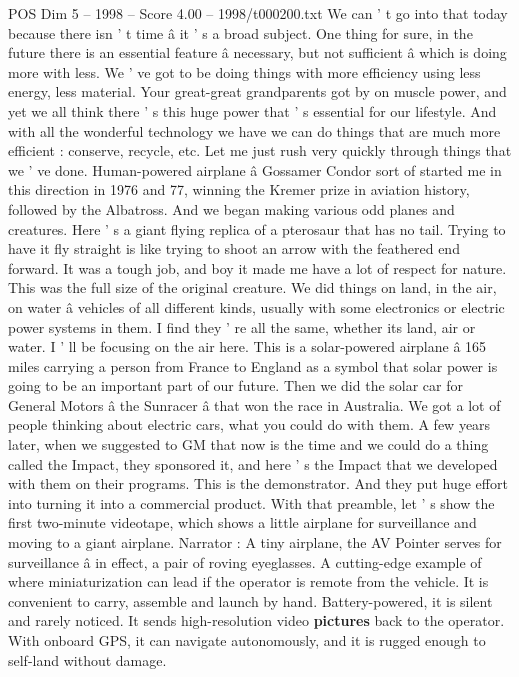 \begin{textsample}{POS Dim 5 – 1998 – Score 4.00 – 1998/t000200.txt}
We can ' t go into that today because there isn ' t time â it ' s a broad subject.
One thing for sure, in the future there is an essential feature â necessary, but not sufficient â which is doing more with less.
We ' ve got to be doing things with more efficiency using less energy, less material.
Your great-great grandparents got by on muscle power, and yet we all think there ' s this huge power that ' s essential for our lifestyle.
And with all the wonderful technology we have we can do things that are much more efficient : conserve, recycle, etc.
Let me just rush very quickly through things that we ' ve done.
Human-powered airplane â Gossamer Condor sort of started me in this direction in 1976 and 77, winning the Kremer prize in aviation history, followed by the Albatross.
And we began making various odd planes and creatures.
Here ' s a giant flying replica of a pterosaur that has no tail.
Trying to have it fly straight is like trying to shoot an arrow with the feathered end forward.
It was a tough job, and boy it made me have a lot of respect for nature.
This was the full size of the original creature.
We did things on land, in the air, on water â vehicles of all different kinds, usually with some electronics or electric power systems in them.
I find they ' re all the same, whether its land, air or water.
I ' ll be focusing on the air here.
This is a solar-powered airplane â 165 miles carrying a person from France to England as a symbol that solar power is going to be an important part of our future.
Then we did the solar car for General Motors â the Sunracer â that won the race in Australia.
We got a lot of people thinking about electric cars, what you could do with them.
A few years later, when we suggested to GM that now is the time and we could do a thing called the Impact, they sponsored it, and here ' s the Impact that we developed with them on their programs.
This is the demonstrator.
And they put huge effort into turning it into a commercial product.
With that preamble, let ' s show the first two-minute videotape, which shows a little airplane for surveillance and moving to a giant airplane.
Narrator : A tiny airplane, the AV Pointer serves for surveillance â in effect, a pair of roving eyeglasses.
A cutting-edge example of where miniaturization can lead if the operator is remote from the vehicle.
It is convenient to carry, assemble and launch by hand.
Battery-powered, it is silent and rarely noticed.
It sends high-resolution video \textbf{pictures} back to the operator.
With onboard GPS, it can navigate autonomously, and it is rugged enough to self-land without damage.

\end{textsample}
